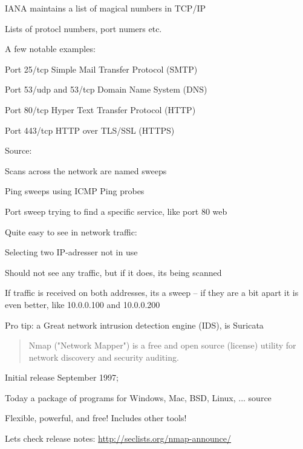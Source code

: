 \documentclass[Screen16to9,17pt]{foils}
\begin{document}


\begin{list1}
\item IANA maintains a list of magical numbers in TCP/IP
\item Lists of protocl numbers, port numers etc.
\item A few notable examples:
\begin{list2}
\item Port 25/tcp Simple Mail Transfer Protocol (SMTP)
\item Port 53/udp and 53/tcp Domain Name System (DNS)
\item Port 80/tcp Hyper Text Transfer Protocol (HTTP)
\item Port 443/tcp HTTP over TLS/SSL (HTTPS)
\end{list2}
\item Source: 
\end{list1}


\begin{list1}
\item Scans across the network are named sweeps
\item Ping sweeps using ICMP Ping probes
\item Port sweep trying to find a specific service, like port 80 web
\item Quite easy to see in network traffic:
\begin{list2}
\item Selecting two IP-adresser not in use
\item Should not see any traffic, but if it does, its being scanned
\item If traffic is received on both addresses, its a sweep -- if they are a bit apart it is even better, like 10.0.0.100 and 10.0.0.200
  \end{list2}

\vskip 2cm
Pro tip: a Great network intrusion detection engine (IDS), is Suricata 
\end{list1}

\begin{quote}
Nmap ("Network Mapper") is a free and open source (license) utility for network discovery and security auditing.
\end{quote}

\begin{list1}
\item Initial release September 1997;
\item Today a package of programs for Windows, Mac, BSD, Linux, ... source
\item Flexible, powerful, and free! Includes other tools!
\item Lets check release notes: \url{http://seclists.org/nmap-announce/}
\end{list1}
\end{document}
